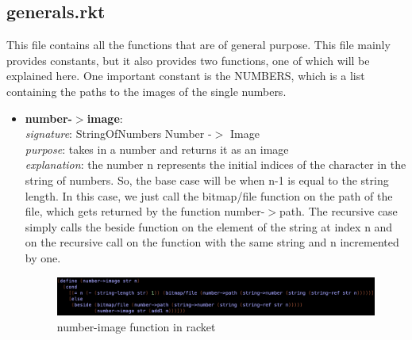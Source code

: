 \documentclass{article}
\begin{document}
	\subsection{generals.rkt}
	This file contains all the functions that are of general purpose. 
	This file mainly provides constants, but it also provides two functions, one of which will be explained here. One important constant is the NUMBERS, which is a list containing the paths to the images of the single numbers.
	\begin{itemize}
		\item \textbf{number-$>$image}: \\
			\emph{signature}: StringOfNumbers Number -$>$ Image \\
			\emph{purpose}: takes in a number and returns it as an image \\
			\emph{explanation}: the number n represents the initial indices of the character in the string of numbers. So, the base case will be when n-1 is equal to the string length. In this case, we just call the bitmap/file function on the path of the file, which gets returned by the function number-$>$path. The recursive case simply calls the beside function on the element of the string at index n and on the recursive call on the function with the same string and n incremented by one.
			\begin{figure}[h!]
				\centering
				\includegraphics[width=.6\linewidth]{number-image.png}
				\caption{number-image function in racket}
			\end{figure}
	\end{itemize}
	
	\pagebreak
	
\end{document}
